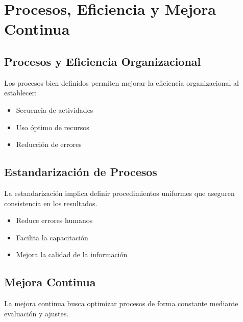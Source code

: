 \documentclass[12pt,a4paper]{article}
\begin{document}
\begin{center}
\end{center}

\section{Procesos, Eficiencia y Mejora Continua}

\subsection{Procesos y Eficiencia Organizacional}
Los procesos bien definidos permiten mejorar la eficiencia organizacional al establecer:

\begin{itemize}
    \item Secuencia de actividades
    \item Uso óptimo de recursos
    \item Reducción de errores
\end{itemize}

\subsection{Estandarización de Procesos}
La estandarización implica definir procedimientos uniformes que aseguren consistencia en los resultados.

\begin{itemize}
    \item Reduce errores humanos
    \item Facilita la capacitación
    \item Mejora la calidad de la información
\end{itemize}

\subsection{Mejora Continua}
La mejora continua busca optimizar procesos de forma constante mediante evaluación y ajustes.
\end{document}
